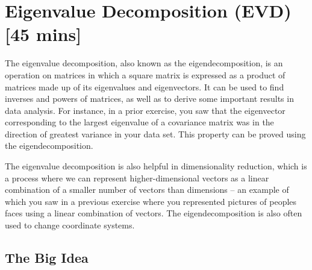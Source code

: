 
\section{Eigenvalue Decomposition (EVD) [45 mins]}

The eigenvalue decomposition, also known as the eigendecomposition, is an operation on matrices in which a square matrix is expressed as a product of matrices made up of its eigenvalues and eigenvectors.   It can be used to find inverses and powers of matrices, as well as to derive some important results in data analysis. For instance,  in a prior exercise, you saw that the eigenvector corresponding to the largest eigenvalue of a covariance matrix was in the direction of greatest variance in your data set. This property can be proved using the eigendecomposition.

The eigenvalue decomposition is also helpful in dimensionality reduction, which is a process where we can represent higher-dimensional vectors as a linear combination of a smaller number of vectors than dimensions -- an example of which you saw in a previous exercise where you represented pictures of peoples faces using a linear combination of vectors. The eigendecomposition is also often used to change coordinate systems.

\subsection{The Big Idea}

